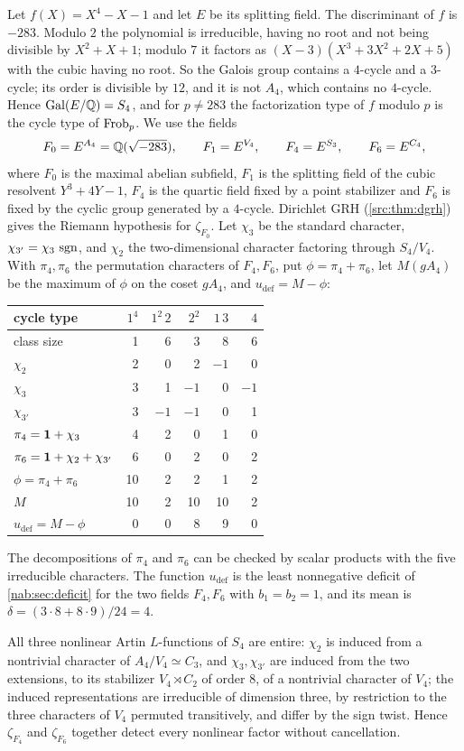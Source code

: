 Let $f(X)=X^4-X-1$ and let $E$ be its splitting field. The discriminant of $f$
is $-283$. Modulo $2$ the polynomial is irreducible, having no root and not
being divisible by $X^2+X+1$; modulo $7$ it factors as
$(X-3)(X^3+3X^2+2X+5)$ with the cubic having no root. So the Galois group
contains a $4$-cycle and a $3$-cycle; its order is divisible by $12$, and it
is not $A_4$, which contains no $4$-cycle. Hence $\operatorname{Gal}(E/\mathbb{Q})=S_4$, and for
$p\ne283$ the factorization type of $f$ modulo $p$ is the cycle type of
$\operatorname{Frob}_p$. We use the fields
\[
 F_0=E^{A_4}=\mathbb{Q}(\sqrt{-283}),\qquad F_1=E^{V_4},\qquad F_4=E^{S_3},\qquad
 F_6=E^{C_4},
\]
where $F_0$ is the maximal abelian subfield, $F_1$ is the splitting field of
the cubic resolvent $Y^3+4Y-1$, $F_4$ is the quartic field fixed by a point
stabilizer and $F_6$ is fixed by the cyclic group generated by a $4$-cycle.
Dirichlet GRH (\cref{src:thm:dgrh}) gives the Riemann hypothesis for
$\zeta_{F_0}$. Let $\chi_3$ be the standard character,
$\chi_{3'}=\chi_3\,\operatorname{sgn}$, and $\chi_2$ the two-dimensional character
factoring through $S_4/V_4$. With $\pi_4,\pi_6$ the permutation characters of
$F_4,F_6$, put $\phi=\pi_4+\pi_6$, let $M(gA_4)$ be the maximum of $\phi$ on
the coset $gA_4$, and $u_{\mathrm{def}}=M-\phi$:
\begin{center}\small
\begin{tabular}{lrrrrr}
\toprule
cycle type & $1^4$ & $1^2\,2$ & $2^2$ & $1\,3$ & $4$\\\midrule
class size & 1&6&3&8&6\\
$\chi_2$ & 2&0&2&$-1$&0\\
$\chi_3$ & 3&1&$-1$&0&$-1$\\
$\chi_{3'}$ & 3&$-1$&$-1$&0&1\\
$\pi_4=\mathbf{1}+\chi_3$ &4&2&0&1&0\\
$\pi_6=\mathbf{1}+\chi_2+\chi_{3'}$ &6&0&2&0&2\\
$\phi=\pi_4+\pi_6$ &10&2&2&1&2\\
$M$ &10&2&10&10&2\\
$u_{\mathrm{def}}=M-\phi$ &0&0&8&9&0\\
\bottomrule
\end{tabular}\end{center}
The decompositions of $\pi_4$ and $\pi_6$ can be checked by scalar products
with the five irreducible characters. The function $u_{\mathrm{def}}$ is the
least nonnegative deficit of \cref{nab:sec:deficit} for the two fields
$F_4,F_6$ with $b_1=b_2=1$, and its mean is
$\delta=(3\cdot8+8\cdot9)/24=4$.

All three nonlinear Artin $L$-functions of $S_4$ are entire: $\chi_2$ is
induced from a nontrivial character of $A_4/V_4\simeq C_3$, and
$\chi_3,\chi_{3'}$ are induced from the two extensions, to its stabilizer
$V_4\rtimes C_2$ of order $8$, of a nontrivial character of $V_4$; the
induced representations are irreducible of dimension three, by restriction to
the three characters of $V_4$ permuted transitively, and differ by the sign
twist. Hence $\zeta_{F_4}$ and $\zeta_{F_6}$ together detect every nonlinear
factor without cancellation.

